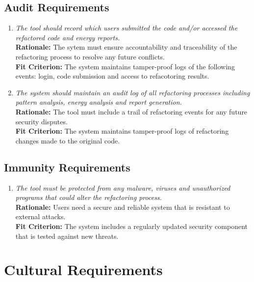 \documentclass[12pt]{article}
\begin{document}
\subsection{Audit Requirements}
\begin{enumerate}[label=SR-AUR \arabic*., wide=0pt, leftmargin=*]
	\item \emph{The tool should record which users submitted the code and/or accessed the refactored code and energy reports.}\\[2mm]
    {\bf Rationale:} The sytem must ensure accountability and traceability of the refactoring process to resolve any future conflicts.\\
    {\bf Fit Criterion:} The system maintains tamper-proof logs of the following events: login, code submission and access to refacotoring results.
  \item \emph{The system should maintain an audit log of all refactoring processes including pattern analysis, energy analysis and report generation. }\\
  {\bf Rationale:} The tool must include a trail of refactoring events for any future security disputes.\\
  {\bf Fit Criterion:}  The system maintains tamper-proof logs of refactoring changes made to the original code.
\end{enumerate}
\subsection{Immunity Requirements}
\begin{enumerate}[label=SR-AUR \arabic*., wide=0pt, leftmargin=*]
	\item \emph{The tool must be protected from any malware, viruses and unauthorized programs that could alter the refactoring process. }\\[2mm]
    {\bf Rationale:} Users need a secure and reliable system that is resistant to external attacks.\\
    {\bf Fit Criterion:} The system includes a regularly updated security component that is tested against new threats.
\end{enumerate}

\section{Cultural Requirements}
\end{document}

